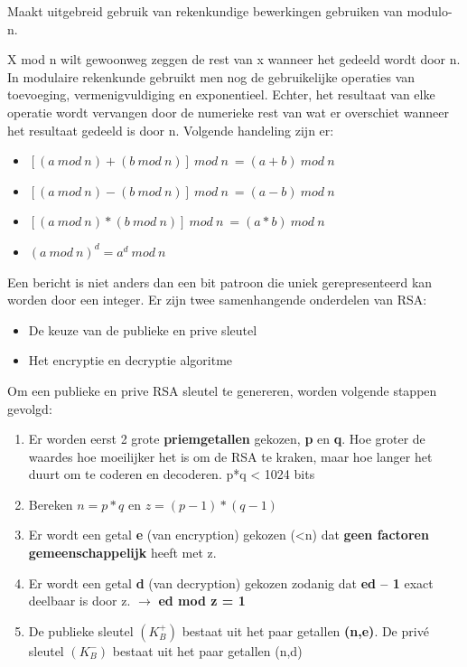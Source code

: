 
Maakt uitgebreid gebruik van rekenkundige bewerkingen gebruiken van modulo-n.

\noindent X mod n wilt gewoonweg zeggen de rest van x wanneer het gedeeld wordt door n. In modulaire rekenkunde gebruikt men nog de gebruikelijke operaties van toevoeging, vermenigvuldiging en exponentieel. Echter, het resultaat van elke operatie wordt vervangen door de numerieke rest van wat er overschiet wanneer het resultaat gedeeld is door n.
Volgende handeling zijn er:

\begin{itemize}

\item $[(a\ mod\ n)  + (b\ mod\ n)] \ mod\ n\ = (a + b)\ mod\ n$
\item $[(a\ mod\ n) - (b\ mod\ n)] \ mod\ n\ = (a - b)\ mod\ n$
\item $[(a\ mod\ n) * (b\ mod\ n)] \ mod\ n\ = (a * b)\ mod\ n$
\item $(a\ mod\ n)^d = a^d\ mod\ n$
\end{itemize}
Een bericht is niet anders dan een bit patroon die uniek gerepresenteerd kan worden door een integer. Er zijn twee samenhangende onderdelen van RSA:

\begin{itemize}
\item De keuze van de publieke en prive sleutel
\item Het encryptie en decryptie algoritme
\end{itemize}


Om een publieke en prive RSA sleutel te genereren, worden volgende stappen gevolgd:

\begin{enumerate}
\item Er worden eerst 2 grote \textbf{priemgetallen} gekozen, \textbf{p} en \textbf{q}. Hoe groter de waardes hoe moeilijker het is om de RSA te kraken, maar hoe langer het duurt om te coderen en decoderen. p*q < 1024 bits
\item Bereken $n = p*q$ en $z = (p - 1)*(q - 1)$
\item Er wordt een getal \textbf{e} (van encryption) gekozen (<n) dat \textbf{geen factoren gemeenschappelijk} heeft met z.
\item Er wordt een getal \textbf{d} (van decryption) gekozen zodanig dat \textbf{ed – 1} exact deelbaar is door z. $\rightarrow$ \textbf{ed mod z = 1}
\item De publieke sleutel $(K^+_B)$ bestaat uit het paar getallen \textbf{(n,e)}. De privé sleutel $(K^-_B)$ bestaat uit het paar getallen (n,d)
\end{enumerate}

